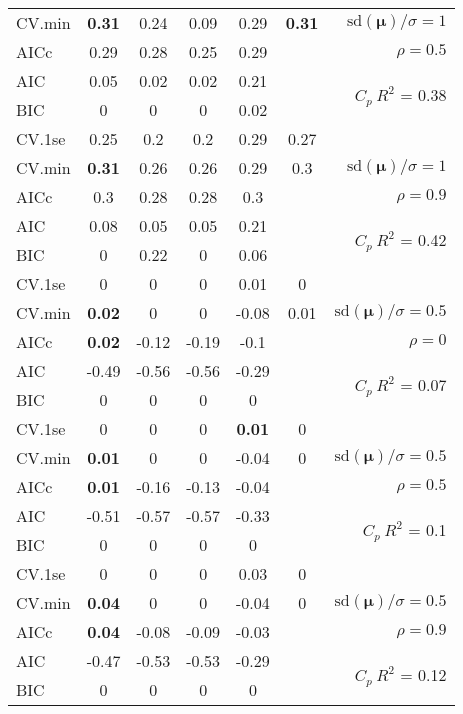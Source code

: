 \documentclass[12pt]{article}
\newcommand{\mr}[1]{\mathrm{#1}}
\newcommand{\bm}[1]{\mathbf{#1}}
\begin{document}
\begin{table}[p]
\begin{center}
\begin{tabular}{l*{5}{c}|r}
CV.min & {\bf 0.31} & 0.24 & 0.09 & 0.29 & {\bf 0.31} &  $\mr{sd}(\bm{\mu})/\sigma=1$ \\
AICc & 0.29 & 0.28 & 0.25 & 0.29 & & $\rho=0.5$ \\
AIC & 0.05 & 0.02 & 0.02 & 0.21 & & \multirow{2}{*}{$C_p ~ R^2$ = 0.38} \\
BIC & 0 & 0 & 0 & 0.02 & & \\
 \hline 
CV.1se & 0.25 & 0.2 & 0.2 & 0.29 & 0.27 &\\
CV.min & {\bf 0.31} & 0.26 & 0.26 & 0.29 & 0.3 &  $\mr{sd}(\bm{\mu})/\sigma=1$ \\
AICc & 0.3 & 0.28 & 0.28 & 0.3 & & $\rho=0.9$ \\
AIC & 0.08 & 0.05 & 0.05 & 0.21 & & \multirow{2}{*}{$C_p ~ R^2$ = 0.42} \\
BIC & 0 & 0.22 & 0 & 0.06 & & \\
 \hline 
CV.1se & 0 & 0 & 0 & 0.01 & 0 &\\
CV.min & {\bf 0.02} & 0 & 0 & -0.08 & 0.01 &  $\mr{sd}(\bm{\mu})/\sigma=0.5$ \\
AICc & {\bf 0.02} & -0.12 & -0.19 & -0.1 & & $\rho=0$ \\
AIC & -0.49 & -0.56 & -0.56 & -0.29 & & \multirow{2}{*}{$C_p ~ R^2$ = 0.07} \\
BIC & 0 & 0 & 0 & 0 & & \\
 \hline 
CV.1se & 0 & 0 & 0 & {\bf 0.01} & 0 &\\
CV.min & {\bf 0.01} & 0 & 0 & -0.04 & 0 &  $\mr{sd}(\bm{\mu})/\sigma=0.5$ \\
AICc & {\bf 0.01} & -0.16 & -0.13 & -0.04 & & $\rho=0.5$ \\
AIC & -0.51 & -0.57 & -0.57 & -0.33 & & \multirow{2}{*}{$C_p ~ R^2$ = 0.1} \\
BIC & 0 & 0 & 0 & 0 & & \\
 \hline 
CV.1se & 0 & 0 & 0 & 0.03 & 0 &\\
CV.min & {\bf 0.04} & 0 & 0 & -0.04 & 0 &  $\mr{sd}(\bm{\mu})/\sigma=0.5$ \\
AICc & {\bf 0.04} & -0.08 & -0.09 & -0.03 & & $\rho=0.9$ \\
AIC & -0.47 & -0.53 & -0.53 & -0.29 & & \multirow{2}{*}{$C_p ~ R^2$ = 0.12} \\
BIC & 0 & 0 & 0 & 0 & & \\
 \hline 
\end{tabular}
\end{center}
\vspace{-1cm}
\end{table}
\end{document}
